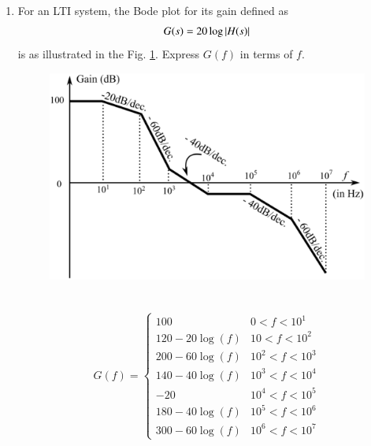 \begin{enumerate}[label=\thesection.\arabic*.,ref=\thesection.\theenumi]

\item For an LTI system, the Bode plot for its gain defined as
\begin{align}
	G(s) = 20\log\left\vert H(s)\right\vert
	\label{eq:ee18btech11001_gain}
\end{align}
is as illustrated in the Fig. \ref{fig:ee18btech11001_bode}. Express $G(f)$ in terms of $f$.\\
\begin{figure}[ht!]
\centering
    \includegraphics[width=\columnwidth]{./figs/ee18btech11001/ee18btech11001.eps}
    \caption{}
    \label{fig:ee18btech11001_bode}
\end{figure}
\\
\solution
\begin{align}
 G(f) = 
 \begin{cases} 
        100 & 0 < f < 10^{1} \\
      120-20\log(f) & 10 < f < 10^{2} \\
      200-60\log(f) & 10^2 < f < 10^{3} \\
      140-40\log(f) & 10^{3} < f < 10^{4} \\
       -20 & 10^{4} < f < 10^{5} \\
      180-40\log(f) & 10^{5} < f < 10^{6} \\
      300-60\log(f) & 10^{6} < f < 10^{7}   
 \end{cases}
\end{align}



\end{enumerate}

